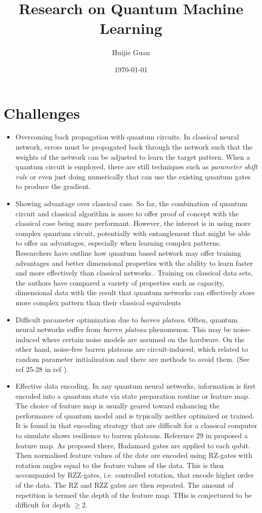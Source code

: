 \documentclass{article}
\begin{document}
\title{Research on Quantum Machine Learning}
\date\today
\maketitle
\author{Huijie Guan}
\section{Challenges}
\begin{itemize}
\item Overcoming back propagation with quantum circuits.
In classical neural network, errors must be propagated back through the network such that the weights of the network can be adjusted to learn the target pattern. When a quantum circuit is employed, there are still techniques such as \textit{parameter shift rule} or even just doing numerically that can use the existing quantum gates to produce the gradient.
\item Showing advantage over classical case. So far, the combination of quantum circuit and classical algorithm is more to offer proof of concept with the classical case being more performant. However, the interest is in using more complex quantum circuit, potentially with entanglement that might be able to offer an advantages, especially when learning complex patterns. Researchers have outline how quantum based network may offer training advantages and better dimensional properties with the ability to learn faster and more effectively than classical networks.\cite{Abbas_2021}. Training on classical data sets, the authors have compared a variety of properties such as capacity, dimensional data with the result that quantum networks can effectively store more complex pattern than their classical equivalents
\item Difficult parameter optimization due to \textit{barren plateau}. Often, quantum neural networks suffer from \textit{barren plateau} phenomenon. This may be noise-induced where certain noise models are assumed on the hardware. On the other hand, noise-free barren plateaus are circuit-induced, which related to random parameter initialization and there are methods to avoid them. (See ref 25-28 in ref \cite{Abbas_2021}). 
\item Effective data encoding. In any quantum neural networks, information is first encoded into a quantum state via state preparation routine or feature map. The choice of feature map is usually geared toward enhancing the performance of quantum model and is typically neither optimized or trained. It is found in \cite{Abbas_2021} that encoding strategy that are difficult for a classical computer to simulate shows resilience to barren plateaus. Reference 29 in \cite{Abbas_2021} proposed a feature map. As proposed there, Hadamard gates are applied to each qubit. Then normalised feature values of the date are encoded using RZ-gates with rotation angles equal to the feature values of the data. This is then accompanied by RZZ-gates, i.e. controlled rotation, that encode higher order of the data. The RZ and RZZ gates are then repeated. The amount of repetition is termed the depth of the feature map. THis is conjectured to be difficult for depth $\geq 2$.

\end{itemize}
\end{document}
